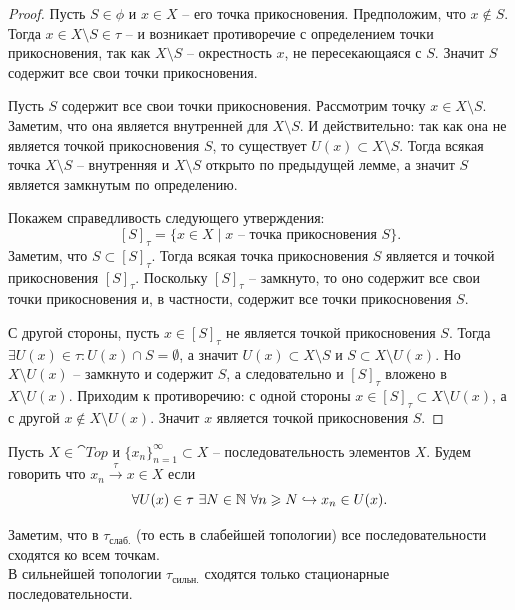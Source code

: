 \begin{proof}
    Пусть $S \in \phi$ и $x \in X$ -- его точка прикосновения.
    Предположим, что $x \notin S$.
    Тогда $x \in X \setminus S \in \tau$ -- и возникает противоречие с определением точки прикосновения, так как $X \setminus S$ -- окрестность $x$, не пересекающаяся с $S$.
    Значит $S$ содержит все свои точки прикосновения.

    Пусть $S$ содержит все свои точки прикосновения.
    Рассмотрим точку $x \in X \setminus S$.
    Заметим, что она является внутренней для $X \setminus S$.
    И действительно: так как она не является точкой прикосновения $S$, то существует $U(x) \subset X \setminus S$.
    Тогда всякая точка $X \setminus S$ -- внутренняя и $X \setminus S$ открыто по предыдущей лемме, а значит $S$ является замкнутым по определению.

    Покажем справедливость следующего утверждения:
    \[
         [S]_\tau = \{x \in X \mid x \text{ -- точка прикосновения }S\}.
    \]
    Заметим, что $S \subset [S]_\tau$.
    Тогда всякая точка прикосновения $S$ является и точкой прикосновения $ [S]_\tau$.
    Поскольку $[S]_\tau$ -- замкнуто, то оно содержит все свои точки прикосновения и, в частности, содержит все точки прикосновения $S$.

    С другой стороны, пусть $x \in [S]_\tau$ не является точкой прикосновения $S$.
    Тогда $\exists U(x) \in \tau \colon U(x) \cap S = \emptyset$, а значит $U(x) \subset X \setminus S$ и $S \subset X \setminus U(x)$.
    Но $X \setminus U(x)$ -- замкнуто и содержит $S$, а следовательно и $[S]_\tau$ вложено в $X \setminus U(x)$.
    Приходим к противоречию: с одной стороны $x \in [S]_\tau \subset X \setminus U(x)$, а с другой $x \notin X \setminus U(x)$.
    Значит $x$ является точкой прикосновения $S$.
\end{proof}
\begin{definition}
    Пусть $X \in \cat{Top}$ и $\{x_n\}_{n = 1}^{\infty} \subset X$ -- последовательность элементов $X$.
    Будем говорить что $x_n \xrightarrow{\tau} x \in X$ если
    \[
        \forall U(x) \in \tau \ \exists N \in \mathbb{N}  \ \forall n \geqslant N \hookrightarrow x_n \in U(x).
    \]
\end{definition}
\begin{examples}
    Заметим, что в $\tau_{\text{слаб.}}$ (то есть в слабейшей топологии) все последовательности сходятся ко всем точкам. \\
    В сильнейшей топологии $\tau_{\text{сильн.}}$ сходятся только стационарные последовательности.
\end{examples}
